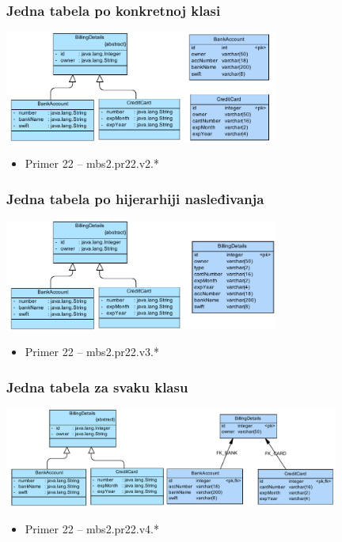 \documentclass[compress]{beamer}
\begin{document}
\begin{frame}
  \frametitle{Jedna tabela po konkretnoj klasi}
  \begin{center}
    \includegraphics[width=9cm]{pic11.pdf}
  \end{center}
  \begin{itemize}
    \item Primer 22 -- mbs2.pr22.v2.*
  \end{itemize}
\end{frame}
\begin{frame}
  \frametitle{Jedna tabela po hijerarhiji nasleđivanja}
  \begin{center}
    \includegraphics[width=9cm]{pic12.pdf}
  \end{center}
  \begin{itemize}
    \item Primer 22 -- mbs2.pr22.v3.*
  \end{itemize}
\end{frame}
\begin{frame}
  \frametitle{Jedna tabela za svaku klasu}
  \begin{center}
    \includegraphics[width=11cm]{pic13.pdf}
  \end{center}
  \begin{itemize}
    \item Primer 22 -- mbs2.pr22.v4.*
  \end{itemize}
\end{frame}
\end{document}
